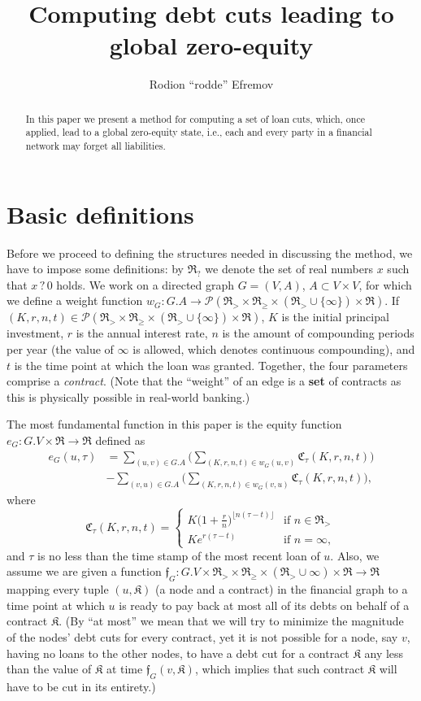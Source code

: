\documentclass[10pt]{article}
\title{Computing debt cuts leading to global zero-equity}
\author{Rodion ``rodde'' Efremov}
\newcommand{\RR}{\mathfrak{R}}
\newcommand{\KK}{\mathfrak{K}}
\newcommand{\CC}{\mathfrak{C}}
\newcommand{\ff}{\mathfrak{f}}
\begin{document}
  \maketitle
  
  \begin{abstract}
  In this paper we present a method for computing a set of loan cuts, which, once applied, lead to a global zero-equity state, i.e., each and every party in a financial network may forget all liabilities. 
  \end{abstract}
  
  \section{Basic definitions}
  Before we proceed to defining the structures needed in discussing the method, we have to impose some definitions: by $\RR_?$ we denote the set of real numbers $x$ such that $x \, ? \, 0$ holds. We work on a directed graph $G=(V,A)$, $A \subset V \times V$, for which we define a weight function $w_G \colon G.A \to \mathcal{P}(\RR_> \times \RR_{\geq} \times (\RR_> \cup \{\infty\}) \times \RR)$. If $(K, r, n, t) \in \mathcal{P}(\RR_> \times \RR_{\geq} \times (\RR_> \cup \{\infty\}) \times \RR)$, $K$ is the initial principal investment, $r$ is the annual interest rate, $n$ is the amount of compounding periods per year (the value of $\infty$ is allowed, which denotes continuous compounding), and $t$ is the time point at which the loan was granted. Together, the four parameters comprise a \textit{contract}. (Note that the ``weight'' of an edge is a \textbf{set} of contracts as this is physically possible in real-world banking.) 

The most fundamental function in this paper is the equity function $e_G \colon G.V \times \RR \to \RR$ defined as 
\begin{align*}
e_G(u, \tau) &= \sum_{(u, v) \in G.A} \Bigg( \sum_{(K, r, n, t) \in w_G(u, v)} \CC_{\tau}(K, r, n, t) \Bigg) \\
&- \sum_{(v, u) \in G.A} \Bigg( \sum_{(K, r, n, t) \in w_G(v,u)} \CC_{\tau}(K, r, n, t) \Bigg),
\end{align*}
where 
\[
\CC_{\tau}(K, r, n, t) = 
\begin{cases}
K\big( 1 + \frac{r}{n}\big)^{\lfloor n(\tau - t) \rfloor} & \mbox{if } n \in \mathfrak{R_>} \\
Ke^{r(\tau - t)} & \mbox{if } n = \infty,
\end{cases}
\]
and $\tau$ is no less than the time stamp of the most recent loan of $u$. Also, we assume we are given a function $\ff_G \colon G.V \times \RR_{>} \times \RR_{\geq} \times (\RR_{>} \cup \infty) \times \RR \to \RR$ mapping every tuple $(u, \KK)$ (a node and a contract) in the financial graph to a time point at which $u$ is ready to pay back at most all of its debts on behalf of a contract $\KK$. (By ``at most'' we mean that we will try to minimize the magnitude of the nodes' debt cuts for every contract, yet it is not possible for a node, say $v$, having no loans to the other nodes, to have a debt cut for a contract $\KK$ any less than the value of $\KK$ at time $\ff_G(v, \KK)$, which implies that such contract $\KK$ will have to be cut in its entirety.)
\end{document}
